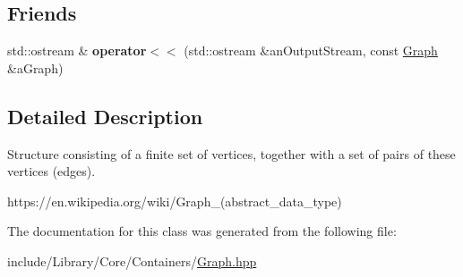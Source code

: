 \subsection*{Friends}
\begin{DoxyCompactItemize}
\item 
\mbox{\label{classlibrary_1_1core_1_1ctnr_1_1_graph_a225f9b61ac2385ccf05891298c7ab6b1}} 
std\+::ostream \& {\bfseries operator$<$$<$} (std\+::ostream \&an\+Output\+Stream, const \hyperlink{classlibrary_1_1core_1_1ctnr_1_1_graph}{Graph} \&a\+Graph)
\end{DoxyCompactItemize}


\subsection{Detailed Description}
Structure consisting of a finite set of vertices, together with a set of pairs of these vertices (edges). 

https\+://en.wikipedia.\+org/wiki/\+Graph\+\_\+(abstract\+\_\+data\+\_\+type) 

The documentation for this class was generated from the following file\+:\begin{DoxyCompactItemize}
\item 
include/\+Library/\+Core/\+Containers/\hyperlink{_graph_8hpp}{Graph.\+hpp}\end{DoxyCompactItemize}
